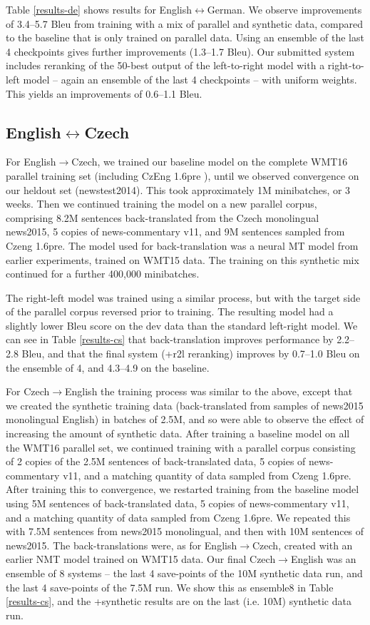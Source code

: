 \documentclass[11pt]{article}
\begin{document}
Table \ref{results-de} shows results for English$\leftrightarrow$German.
We observe improvements of 3.4--5.7 {\sc Bleu} from training with a mix of parallel and synthetic data, compared to the baseline that is only trained on parallel data.
Using an ensemble of the last 4 checkpoints gives further improvements (1.3--1.7 {\sc Bleu}).
Our submitted system includes reranking of the 50-best output of the left-to-right model with a right-to-left model -- again an ensemble of the last 4 checkpoints -- with uniform weights.
This yields an improvements of 0.6--1.1 {\sc Bleu}.

\subsection{English$\leftrightarrow$Czech}
For English$\rightarrow$Czech, we trained our baseline model on the complete WMT16 parallel training set (including CzEng 1.6pre \cite{czeng16:2016}), until we observed convergence on our
heldout set (newstest2014). This took approximately 1M minibatches, or 3 weeks. Then we continued training the model on a new parallel corpus, comprising
8.2M sentences back-translated from the Czech monolingual news2015, 5 copies of news-commentary v11, and 9M sentences sampled from Czeng 1.6pre. The
model used for back-translation was a neural MT model from earlier experiments, trained on WMT15 data. The training
on this synthetic mix continued for a further 400,000 minibatches.

The right-left model was trained using a similar process, but with the target side of the parallel corpus reversed prior to training. The
resulting model had a slightly lower {\sc Bleu} score on the dev data than the standard left-right model.
We can see in Table \ref{results-cs} that back-translation improves performance by 
2.2--2.8 {\sc Bleu}, and that 
 the final system (+r2l reranking) improves by 0.7--1.0 {\sc Bleu} on the ensemble of 4, and 4.3--4.9 on the baseline.

For Czech$\rightarrow$English the training process was similar to the above, except that we created the synthetic training data (back-translated from samples of news2015 monolingual English)
in batches of 2.5M, and so were able to observe the effect of increasing the amount of synthetic data. After training a baseline model on all the WMT16 parallel set, 
we continued training with a parallel corpus consisting of 2 copies of the 2.5M sentences of back-translated data, 5 copies of news-commentary v11, and a matching 
quantity of data sampled from Czeng 1.6pre. After training this to convergence, we restarted training from the baseline model using 5M sentences of 
back-translated data, 5 copies of news-commentary v11, and a matching quantity of data sampled from Czeng 1.6pre. We repeated this with 7.5M sentences from
news2015 monolingual, and then with 10M sentences of news2015. The back-translations were, as for English$\rightarrow$Czech, created with an earlier NMT 
model trained on WMT15 data.
Our final Czech$\rightarrow$English was an ensemble of 8 systems -- the last 4 save-points of the 10M synthetic data run, and the last 4 save-points of the
7.5M run. We show this as ensemble8 in Table \ref{results-cs}, and the +synthetic results are on the last (i.e. 10M) synthetic data run. 
\end{document}
